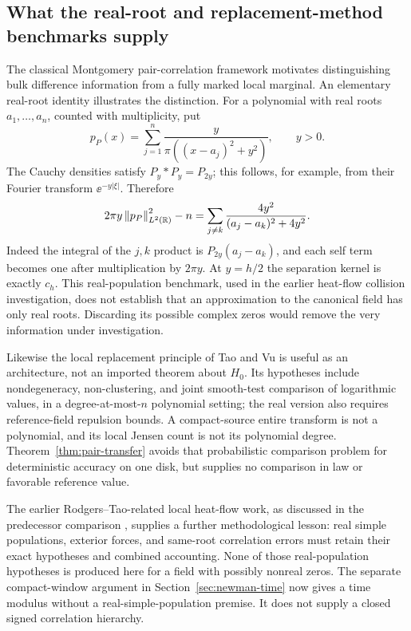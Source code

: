 \subsection{What the real-root and replacement-method benchmarks supply}

The classical Montgomery pair-correlation framework
\cite{Montgomery1973} motivates distinguishing bulk difference
information from a fully marked local marginal. An elementary
real-root identity illustrates the distinction. For a polynomial
with real roots $a_1,\ldots,a_n$, counted with multiplicity, put
\[
 p_P(x)=\sum_{j=1}^n\frac{y}{\pi((x-a_j)^2+y^2)},\qquad y>0 .
\]
The Cauchy densities satisfy $P_y*P_y=P_{2y}$; this follows,
for example, from their Fourier transform $\ee^{-y|\xi|}$.
Therefore
\begin{equation}\label{eq:real-poisson}
 2\pi y\left\|p_P\right\|_{L^2(\mathbb R)}^2-n
 =\sum_{j\ne k}\frac{4y^2}{(a_j-a_k)^2+4y^2}.
\end{equation}
Indeed the integral of the $j,k$ product is
$P_{2y}(a_j-a_k)$, and each self term becomes one after
multiplication by $2\pi y$.
At $y=h/2$ the separation kernel is exactly $c_h$.
This real-population benchmark, used in the earlier heat-flow
collision investigation, does not establish that an
approximation to the canonical field has only real roots.
Discarding its possible complex zeros would remove the very
information under investigation.

Likewise the local replacement principle of Tao and Vu
\cite[Theorems 2.1 and 3.1]{TaoVu2014LocalZeros}
is useful as an architecture, not an imported theorem about
$H_0$. Its hypotheses include nondegeneracy, non-clustering,
and joint smooth-test comparison of logarithmic values, in a
degree-at-most-$n$ polynomial setting; the real version also
requires reference-field repulsion bounds.
A compact-source entire transform is not a polynomial, and
its local Jensen count is not its polynomial degree.
Theorem~\ref{thm:pair-transfer} avoids that probabilistic
comparison problem for deterministic accuracy on one disk,
but supplies no comparison in law or favorable reference value.

The earlier Rodgers--Tao-related local heat-flow work, as
discussed in the predecessor comparison \cite{OCArithmetic},
supplies a further methodological lesson: real simple populations,
exterior forces, and same-root correlation errors must retain
their exact hypotheses and combined accounting. None of those
real-population hypotheses is produced here for a field with
possibly nonreal zeros. The separate compact-window argument in Section~\ref{sec:newman-time}
now gives a time modulus without a real-simple-population premise.
It does not supply a closed signed correlation hierarchy.

